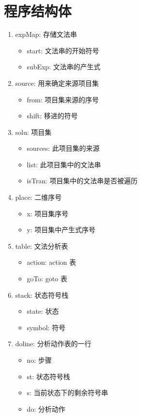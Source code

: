 \documentclass[fontset=none,UTF8,a4paper,zihao=-4]{ctexart}
\begin{document}
\section{程序结构体}
\label{sec:org5342c77}
\begin{enumerate}
\item expMap: 存储文法串
\begin{itemize}
\item start:  文法串的开始符号
\item subExp: 文法串的产生式
\end{itemize}
\item source: 用来确定来源项目集
\begin{itemize}
\item from:  项目集来源的序号
\item shift: 移进的符号
\end{itemize}
\item solu: 项目集
\begin{itemize}
\item sources: 此项目集的来源
\item list:    此项目集中的文法串
\item isTran:  项目集中的文法串是否被遍历
\end{itemize}
\item place: 二维序号
\begin{itemize}
\item x: 项目集序号
\item y: 项目集中产生式序号
\end{itemize}
\item table: 文法分析表
\begin{itemize}
\item action: action 表
\item goTo: goto 表
\end{itemize}
\item stack: 状态符号栈
\begin{itemize}
\item state:  状态
\item symbol: 符号
\end{itemize}
\item doline: 分析动作表的一行
\begin{itemize}
\item no: 步骤
\item st: 状态符号栈
\item s:  当前状态下的剩余符号串
\item do: 分析动作
\end{itemize}
\end{enumerate}
\end{document}
